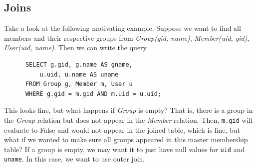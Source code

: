 \documentclass{article}
\begin{document}
  \subsection{Joins} 
    
    Take a look at the following motivating example. Suppose we want to find all members and their respective groups from \textit{Group(gid, name)}, \textit{Member(uid, gid)}, \textit{User(uid, name)}. Then we can write the query 
    \begin{lstlisting}
      SELECT g.gid, g.name AS gname, 
          u.uid, u.name AS uname 
      FROM Group g, Member m, User u 
      WHERE g.gid = m.gid AND m.uid = u.uid; 
    \end{lstlisting}
    This looks fine, but what happens if \textit{Group} is empty? That is, there is a group in the \textit{Group} relation but does not appear in the \textit{Member} relation. Then, \texttt{m.gid} will evaluate to False and would not appear in the joined table, which is fine, but what if we wanted to make sure all groups appeared in this master membership table? If a group is empty, we may want it to just have null values for \texttt{uid} and \texttt{uname}. In this case, we want to use outer join. 
\end{document}
